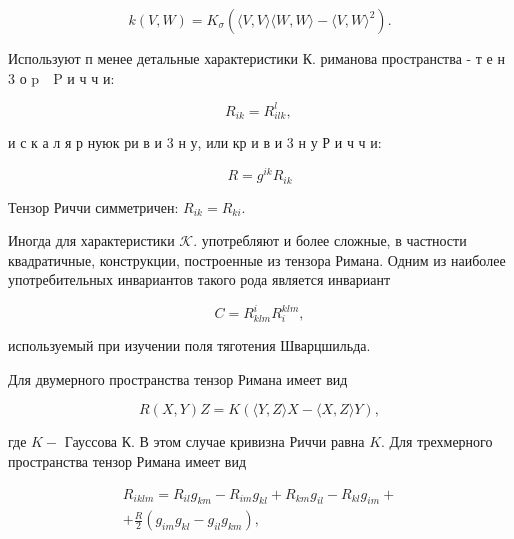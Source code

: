 \documentclass[10pt]{article}
\begin{document}
\[

k(V, W)=K_{\sigma}\left(\langle V, V\rangle\langle W, W\rangle-\langle V, W\rangle^{2}\right) .

\]



Используют п менее детальные характеристики К. риманова пространства - т е н 3 о $\mathrm{p} \quad \mathrm{P}$ и ч ч и:



\[

R_{i k}=R_{i l k}^{l} \text {, }

\]



и с к а л я р нуюк ри в и 3 н у, или кр и в и 3 н у Р и ч ч и:



\[

R=g^{i k} R_{i k}

\]



Тензор Риччи симметричен: $R_{i k}=R_{k i}$.



Иногда для характеристики $\mathcal{K}$. употребляют и более сложные, в частности квадратичные, конструкции, построенные из тензора Римана. Одним из наиболее употребительных инвариантов такого рода является инвариант



\[

C=R_{k l m}^{i} R_{i}^{k l m},

\]



используемый при изучении поля тяготения Шварцшильда.



Для двумерного пространства тензор Римана имеет вид



\[

R(X, Y) Z=K(\langle Y, Z\rangle X-\langle X, Z\rangle Y),

\]



где $K-$ Гауссова К. В этом случае кривизна Риччи равна $K$. Для трехмерного пространства тензор Римана имеет вид



\[

\begin{gathered}

R_{i k l m}=R_{i l} g_{k m}-R_{i m} g_{k l}+R_{k m} g_{i l}-R_{k l} g_{i m}+ \\

+\frac{R}{2}\left(g_{i m} g_{k l}-g_{i l} g_{k m}\right),

\end{gathered}

\]
\end{document}
